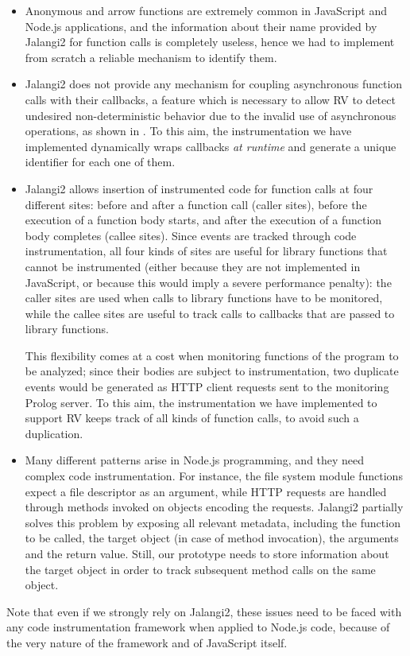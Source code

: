 \begin{itemize}
\item Anonymous and arrow functions are extremely common in JavaScript and Node.js applications, and the information about their name
  provided by Jalangi2 for function calls is completely  useless, hence we had to implement from scratch a reliable mechanism to identify them.
\item Jalangi2 does not provide any mechanism for coupling asynchronous function calls with their callbacks, a feature which is
  necessary to allow RV to detect undesired non-deterministic behavior due to the invalid use of asynchronous operations, as shown in
  . %
To this aim, the instrumentation we have implemented dynamically wraps callbacks \emph{at runtime} and generate a unique identifier for each one of them.
\item Jalangi2 allows insertion of instrumented code for function calls at four different sites: before and after a function call (caller sites), 
  before the execution of a function body starts, and after the execution of a function body completes (callee sites). Since
  events are tracked through code instrumentation, all four kinds of sites are useful for library functions that cannot be
  instrumented (either because they are not implemented in JavaScript, or because this would imply a severe performance penalty):  the caller sites
  are used when calls to library functions have to be monitored, while the callee sites are useful to track calls to callbacks that are passed to
  library functions.

  This flexibility comes at a cost when monitoring functions of the program to be analyzed; since their bodies are subject to instrumentation, two duplicate events would be generated as HTTP client requests sent to the monitoring Prolog server. To this aim,
  the instrumentation we have implemented to support RV keeps track of all kinds of function calls, to avoid such a duplication.
\item Many different patterns arise in Node.js programming, and they need complex code instrumentation.
For instance, the file system module functions expect a file descriptor as an argument, while HTTP requests are handled through methods invoked on objects encoding the requests.
Jalangi2 partially solves this problem by exposing all relevant metadata, including the function to be called, the target object (in case of method invocation), the arguments and the return value.
Still, our prototype needs to store information about the target object in order to track subsequent method calls on the same object.
\end{itemize}
Note that even if we strongly rely on Jalangi2, these issues need to be faced with any code instrumentation framework when applied to Node.js code, because of the very nature of the framework and of JavaScript itself.

